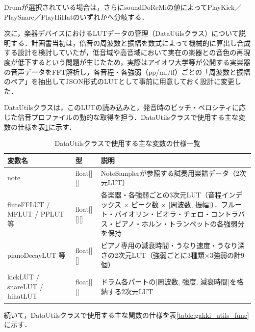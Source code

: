 Drumが選択されている場合は，さらにsoundDoReMiの値によってPlayKick／PlaySnare／PlayHiHatのいずれかへ分岐する．

\fi

次に，楽器デバイスにおけるLUTデータの管理（DataUtilsクラス）について説明する．計画書当初は，倍音の周波数と振幅を数式によって機械的に算出し合成する設計を検討していたが，低音域や高音域において実在の楽器との音色の再現度が低下するという問題が生じたため，実際はアイオワ大学等が公開する実楽器の音声データをFFT解析し，各音程・各強弱（pp/mf/ff）ごとの「周波数と振幅のペア」を抽出してJSON形式のLUTとして事前に用意しておく設計に変更した．

\iffalse
DataUtilsクラスは，このLUTの読み込みと，発音時のピッチ・ベロシティに応じた倍音プロファイルの動的な取得を担う．DataUtilsクラスで使用する主な変数の仕様を表\ref{table:gakki_utils_var}に示す．

\begin{table}[H]
    \caption{DataUtilsクラスで使用する主な変数の仕様一覧}
    \centering
    \label{table:gakki_utils_var}
    \begin{tabular}{p{4.4cm}p{2.9cm}p{6.2cm}}
    \hline
    \textbf{変数名} & \textbf{型} & \textbf{説明}\\
    \hline
    note & float[][] & NoteSamplerが参照する試奏用楽譜データ（2次元LUT）\\
    \hline
    fluteFFLUT / MFLUT / PPLUT 等 & float[][][] & 各楽器・各強弱ごとの3次元LUT（音程インデックス × ピーク数 × [周波数, 振幅]）．フルート・バイオリン・ビオラ・チェロ・コントラバス・ピアノ・ホルン・トランペットの各強弱分を保持\\
    \hline
    pianoDecayLUT 等 & float[][] & ピアノ専用の減衰時間・うなり速度・うなり深さの2次元LUT（強弱ごとに3種類×3強弱の計9個）\\
    \hline
    kickLUT / snareLUT / hihatLUT & float[][] & ドラム各パートの[周波数, 強度, 減衰時間]を格納する2次元LUT\\
    \hline
    \end{tabular}
\end{table}

続いて，DataUtilsクラスで使用する主な関数の仕様を表\ref{table:gakki_utils_func}に示す．

